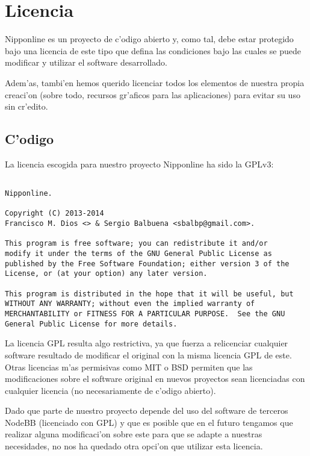 \section{Licencia}
\label{sub:licencia}

Nipponline es un proyecto de c'odigo abierto y, como tal, debe estar protegido bajo una licencia de este tipo que 
defina las condiciones bajo las cuales se puede modificar y utilizar el software desarrollado.

Adem'as, tambi'en hemos querido licenciar todos los elementos de nuestra propia creaci'on (sobre todo, recursos gr'aficos 
para las aplicaciones) para evitar su uso sin cr'edito.

\subsection{C'odigo}
\label{sub:licencia_codigo}

La licencia escogida para nuestro proyecto Nipponline ha sido la GPLv3\cite{gpl}:

\begin{verbatim}

Nipponline.

Copyright (C) 2013-2014 
Francisco M. Dios <> & Sergio Balbuena <sbalbp@gmail.com>.

This program is free software; you can redistribute it and/or
modify it under the terms of the GNU General Public License as
published by the Free Software Foundation; either version 3 of the
License, or (at your option) any later version.

This program is distributed in the hope that it will be useful, but
WITHOUT ANY WARRANTY; without even the implied warranty of
MERCHANTABILITY or FITNESS FOR A PARTICULAR PURPOSE.  See the GNU
General Public License for more details.

\end{verbatim}

La licencia GPL resulta algo restrictiva, ya que fuerza a relicenciar cualquier software resultado de modificar el
original con la misma licencia GPL de este. Otras licencias m'as permisivas como MIT o BSD permiten que las 
modificaciones sobre el software original en nuevos proyectos sean licenciadas con cualquier licencia (no 
necesariamente de c'odigo abierto).

Dado que parte de nuestro proyecto depende del uso del software de terceros NodeBB (licenciado con GPL) y que es 
posible que en el futuro tengamos que realizar alguna modificaci'on sobre este para que se adapte a nuestras necesidades,
 no nos ha quedado otra opci'on que utilizar esta licencia.
 
